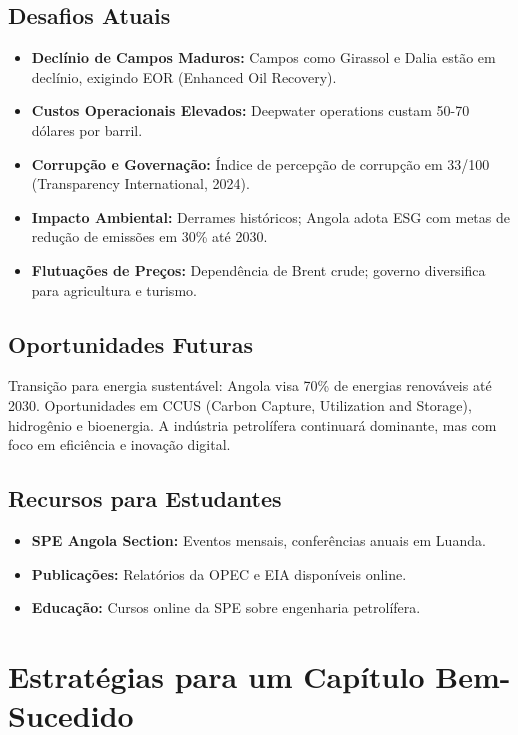 \documentclass[12pt]{article}
\begin{document}
\subsection{Desafios Atuais}
\begin{itemize}
    \item \textbf{Declínio de Campos Maduros:} Campos como Girassol e Dalia estão em declínio, exigindo EOR (Enhanced Oil Recovery).
    \item \textbf{Custos Operacionais Elevados:} Deepwater operations custam 50-70 dólares por barril.
    \item \textbf{Corrupção e Governação:} Índice de percepção de corrupção em 33/100 (Transparency International, 2024).
    \item \textbf{Impacto Ambiental:} Derrames históricos; Angola adota ESG com metas de redução de emissões em 30\% até 2030.
    \item \textbf{Flutuações de Preços:} Dependência de Brent crude; governo diversifica para agricultura e turismo.
\end{itemize}

\subsection{Oportunidades Futuras}
Transição para energia sustentável: Angola visa 70\% de energias renováveis até 2030. Oportunidades em CCUS (Carbon Capture, Utilization and Storage), hidrogênio e bioenergia. A indústria petrolífera continuará dominante, mas com foco em eficiência e inovação digital.

\subsection{Recursos para Estudantes}
\begin{itemize}
    \item \textbf{SPE Angola Section:} Eventos mensais, conferências anuais em Luanda.
    \item \textbf{Publicações:} Relatórios da OPEC e EIA disponíveis online.
    \item \textbf{Educação:} Cursos online da SPE sobre engenharia petrolífera.
\end{itemize}

\newpage

\section{Estratégias para um Capítulo Bem-Sucedido}
\end{document}
